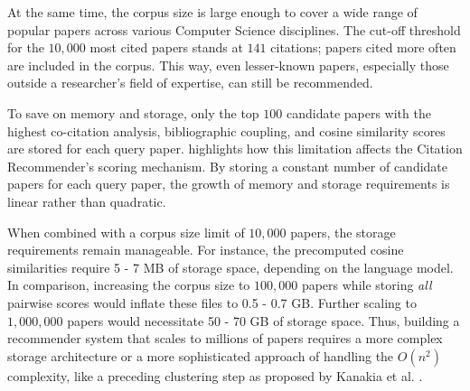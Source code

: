 At the same time, the corpus size is large enough to cover a wide range of popular papers across various Computer Science disciplines.
The cut-off threshold for the $10,000$ most cited papers stands at $141$ citations; papers cited more often are included in the corpus.
This way, even lesser-known papers, especially those outside a researcher's field of expertise, can still be recommended.

To save on memory and storage, only the top $100$ candidate papers with the highest co-citation analysis, bibliographic coupling, and cosine similarity scores are stored for each query paper.  highlights how this limitation affects the Citation Recommender's scoring mechanism.
By storing a constant number of candidate papers for each query paper, the growth of memory and storage requirements is linear rather than quadratic.

When combined with a corpus size limit of $10,000$ papers, the storage requirements remain manageable.
For instance, the precomputed cosine similarities require 5 - 7 MB of storage space, depending on the language model. In comparison, increasing the corpus size to $100,000$ papers while storing \emph{all} pairwise scores would inflate these files to 0.5 - 0.7 GB. Further scaling to $1,000,000$ papers would necessitate 50 - 70 GB of storage space.
Thus, building a recommender system that scales to millions of papers requires a more complex storage architecture or a more sophisticated approach of handling the $O(n^2)$ complexity, like a preceding clustering step as proposed by Kanakia et al. \cite{KanakiaScalableHybrid2019}.
